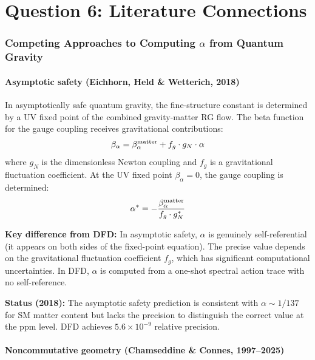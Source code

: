 \documentclass[12pt,a4paper]{article}
\begin{document}
\part{Question 6: Literature Connections}
\label{part:q6}

\section{Competing Approaches to Computing $\alpha$ from Quantum Gravity}

\subsection{Asymptotic safety (Eichhorn, Held \& Wetterich, 2018)}

In asymptotically safe quantum gravity, the fine-structure constant is determined by a UV fixed point of the combined gravity-matter RG flow. The beta function for the gauge coupling receives gravitational contributions:
\begin{equation}
\beta_\alpha = \beta_\alpha^{\rm matter} + f_g \cdot g_N \cdot \alpha
\end{equation}
where $g_N$ is the dimensionless Newton coupling and $f_g$ is a gravitational fluctuation coefficient. At the UV fixed point $\beta_\alpha = 0$, the gauge coupling is determined:
\begin{equation}
\alpha^* = -\frac{\beta_\alpha^{\rm matter}}{f_g \cdot g_N^*}
\end{equation}

\textbf{Key difference from DFD:} In asymptotic safety, $\alpha$ is genuinely self-referential (it appears on both sides of the fixed-point equation). The precise value depends on the gravitational fluctuation coefficient $f_g$, which has significant computational uncertainties. In DFD, $\alpha$ is computed from a one-shot spectral action trace with no self-reference.

\textbf{Status (2018):} The asymptotic safety prediction is consistent with $\alpha \sim 1/137$ for SM matter content but lacks the precision to distinguish the correct value at the ppm level. DFD achieves $5.6 \times 10^{-9}$ relative precision.

\subsection{Noncommutative geometry (Chamseddine \& Connes, 1997--2025)}
\end{document}
